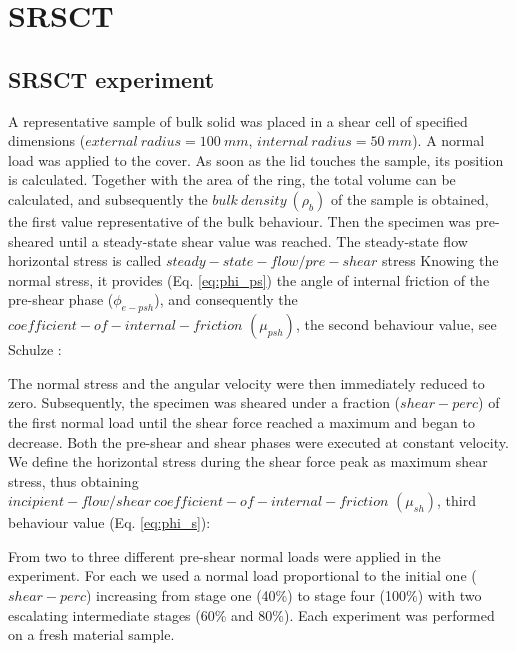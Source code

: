 \begin{appendix}
\label{appendix}

\section{SRSCT}
\label{sec:srsct}

\subsection{SRSCT experiment}
\label{subsec:srsctexperiment}
A representative sample of bulk solid was placed in a shear cell of specified
dimensions ($external ~ radius = 100 ~ mm$, $internal ~ radius = 50 ~ mm$).
% 
A normal load was applied to the cover. As soon as the lid touches the sample, its position is calculated.
Together with the area of the ring, the total volume can be calculated, and subsequently the $bulk ~ density ~ (\rho_b)$ 
of the sample is obtained, the first value representative of the bulk behaviour.
Then the specimen was pre-sheared until a steady-state shear value was reached.
The steady-state flow horizontal stress
is called $steady-state-flow/pre-shear$ stress
Knowing the normal stress, it provides (Eq. \ref{eq:phi_ps}) the angle of
internal friction of the pre-shear phase ($\phi_{e-psh}$), and consequently the $coefficient-of-internal-friction $ $ (\mu_{psh})$, the
second behaviour value, see Schulze \cite{RefWorks:118}:
   
% 
The normal stress and the angular velocity were then immediately reduced to zero. 
Subsequently, the specimen was sheared under a fraction ($shear-perc$) of the first normal load until the shear force 
reached a maximum and began to decrease. 
Both the pre-shear and shear phases were executed at constant velocity. 
We define the horizontal stress during the shear force peak as maximum shear stress, 
thus obtaining $incipient-flow/shear ~ coefficient-of-internal-friction $ $ (\mu_{sh})$, 
third behaviour value (Eq. \ref{eq:phi_s})\cite{RefWorks:118}:
 
From two to three different pre-shear normal loads were applied in the experiment. 
For each we used a normal load proportional to the initial one ($shear-perc$) increasing from stage one (40\%) 
to stage four (100\%) with two escalating intermediate stages (60\% and 80\%).
Each experiment was performed on a fresh material sample. \\
%
%



\end{appendix}
